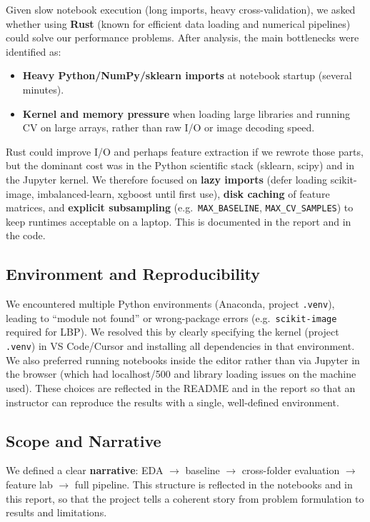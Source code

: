 \documentclass[11pt,a4paper]{article}
\begin{document}
Given slow notebook execution (long imports, heavy cross-validation), we asked whether using \textbf{Rust} (known for efficient data loading and numerical pipelines) could solve our performance problems. After analysis, the main bottlenecks were identified as:
\begin{itemize}
  \item \textbf{Heavy Python/NumPy/sklearn imports} at notebook startup (several minutes).
  \item \textbf{Kernel and memory pressure} when loading large libraries and running CV on large arrays, rather than raw I/O or image decoding speed.
\end{itemize}

Rust could improve I/O and perhaps feature extraction if we rewrote those parts, but the dominant cost was in the Python scientific stack (sklearn, scipy) and in the Jupyter kernel. We therefore focused on \textbf{lazy imports} (defer loading scikit-image, imbalanced-learn, xgboost until first use), \textbf{disk caching} of feature matrices, and \textbf{explicit subsampling} (e.g.\ \texttt{MAX\_BASELINE}, \texttt{MAX\_CV\_SAMPLES}) to keep runtimes acceptable on a laptop. This is documented in the report and in the code.

\subsection{Environment and Reproducibility}

We encountered multiple Python environments (Anaconda, project \texttt{.venv}), leading to ``module not found'' or wrong-package errors (e.g.\ \texttt{scikit-image} required for LBP). We resolved this by clearly specifying the kernel (project \texttt{.venv}) in VS Code/Cursor and installing all dependencies in that environment. We also preferred running notebooks inside the editor rather than via Jupyter in the browser (which had localhost/500 and library loading issues on the machine used). These choices are reflected in the README and in the report so that an instructor can reproduce the results with a single, well-defined environment.

\subsection{Scope and Narrative}

We defined a clear \textbf{narrative}: EDA $\to$ baseline $\to$ cross-folder evaluation $\to$ feature lab $\to$ full pipeline. This structure is reflected in the notebooks and in this report, so that the project tells a coherent story from problem formulation to results and limitations.
\end{document}
